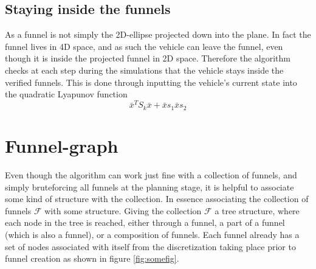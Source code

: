 \subsection{Staying inside the funnels}

As a funnel is not simply the 2D-ellipse projected down into the plane. In fact
the funnel lives in 4D space, and as such the vehicle can leave the funnel, even
though it is inside the projected funnel in 2D space. Therefore the \rrtfunnel{}
algorithm checks at each step during the simulations that the vehicle stays
inside the verified funnels. This is done through inputting the vehicle's
current state into the quadratic Lyapunov function
\[
  {\bar{x}}^{T}S_{k}\bar{x} + \bar{x}s_{1} \bar{x} s_{2}
\]

\section{Funnel-graph}

Even though the \rrtfunnel{} algorithm can work just fine with a collection of
funnels, and simply bruteforcing all funnels at the planning stage, it is
helpful to associate some kind of structure with the collection. In essence
associating the collection of funnels \(\mathcal{F}\) with some structure.
Giving the collection \(\mathcal{F}\) a tree structure, where each node in the
tree is reached, either through a funnel, a part of a funnel (which is also a
funnel), or a composition of funnels. Each funnel already has a set of nodes
associated with itself from the discretization taking place prior to funnel
creation as shown in figure \ref{fig:somefig}.

